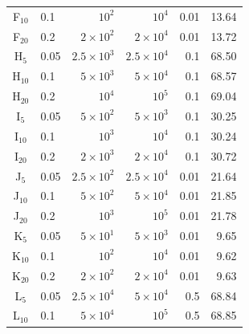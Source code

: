 \begin{table}[!h]
\begin{tabular}{clrrrr}
		\rowcolor[gray]{1}
		F$_{10}$ & 0.1  & $10^2$  & $10^4$  & 0.01  & 13.64 \\
		
		\rowcolor[gray]{1}
		F$_{20}$ & 0.2  & $2 \times 10^2$  & $2 \times 10^4$  & 0.01  & 13.72 \\
		
		\rowcolor[gray]{0.9}
		H$_{5}$ & 0.05  & $2.5 \times 10^3$  & $2.5 \times 10^4$  & 0.1  & 68.50 \\
		
		\rowcolor[gray]{0.9}
		H$_{10}$ & 0.1  & $5 \times 10^3$  & $5 \times 10^4$  & 0.1  & 68.57 \\
		
		\rowcolor[gray]{0.9}
		H$_{20}$ & 0.2  & $10^4$  & $10^5$  & 0.1  & 69.04 \\
		
		\rowcolor[gray]{1}
		I$_{5}$ & 0.05  & $5 \times 10^2$  & $5 \times 10^3$  & 0.1 & 30.25 \\
		
		\rowcolor[gray]{1}
		I$_{10}$ & 0.1  & $10^3$  & $10^4$  & 0.1 & 30.24 \\
		
		\rowcolor[gray]{1}
		I$_{20}$ & 0.2  & $2 \times 10^3$  & $2 \times 10^4$  & 0.1 & 30.72 \\
		
		\rowcolor[gray]{0.9}
		J$_{5}$ & 0.05  & $2.5 \times 10^2$  & $2.5 \times 10^4$  & 0.01 & 21.64 \\
		
		\rowcolor[gray]{0.9}
		J$_{10}$ & 0.1  & $5 \times 10^2$  & $5 \times 10^4$  & 0.01 & 21.85 \\
		
		\rowcolor[gray]{0.9}
		J$_{20}$ & 0.2  & $10^3$  & $10^5$  & 0.01 & 21.78 \\
		
		\rowcolor[gray]{1}
		K$_{5}$ & 0.05  & $5 \times 10^1$  & $5 \times 10^3$  & 0.01 & 9.65 \\
		
		\rowcolor[gray]{1}
		K$_{10}$ & 0.1  & $10^2$  & $10^4$  & 0.01 & 9.62 \\
		
		\rowcolor[gray]{1}
		K$_{20}$ & 0.2  & $2 \times 10^2$  & $2 \times 10^4$  & 0.01 & 9.63 \\
		
		\rowcolor[gray]{0.9}
		L$_{5}$ & 0.05  & $2.5 \times 10^4$  & $5 \times 10^4$  & 0.5 & 68.84 \\
		
		\rowcolor[gray]{0.9}
		L$_{10}$ & 0.1  & $5 \times 10^4$  & $10^5$  & 0.5 & 68.85 \\
		

\end{tabular}
\end{table}
